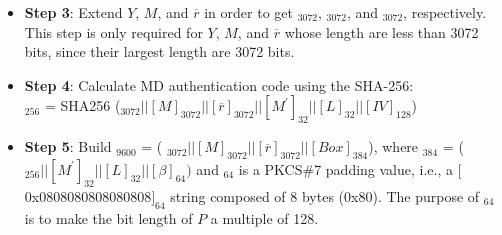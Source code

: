 \documentclass[main\_\_EN.tex]{subfiles}
\begin{document}
\begin{itemize}
    \item {\bfseries Step 3}: Extend \begin{math}Y\end{math}, \begin{math}M\end{math}, and \begin{math}\overline{r}\end{math} in order to get \begin{math}[Y]_{3072}\end{math}, \begin{math}[M]_{3072}\end{math}, and \begin{math}[\overline{r}]_{3072}\end{math}, respectively. This step is only required for \begin{math}Y\end{math}, \begin{math}M\end{math}, and \begin{math}\overline{r}\end{math} whose length are less than 3072 bits, since their largest length are 3072 bits.


    \item {\bfseries Step 4}: Calculate MD authentication code using the SHA-256:\\
                \begin{math}[MD]_{256}\end{math} = SHA256 (\begin{math}
                [Y]_{3072} ||
                [M]_{3072} ||
                [\overline{r}]_{3072} ||
                [M^{\prime}]_{32} ||
                [L]_{32} ||
                [IV]_{128}
            \end{math})

    \item {\bfseries Step 5}: Build \begin{math}[P]_{9600}\end{math} = (
            \begin{math}
                [Y]_{3072} ||
                [M]_{3072} ||
                [\overline{r}]_{3072} ||
                [Box]_{384}
            \end{math}), where
            \begin{math}[Box]_{384}\end{math} = (
            \begin{math}
                [MD]_{256} ||
                [M^{\prime}]_{32} ||
                [L]_{32} ||
                [\beta]_{64})
            \end{math} and
            \begin{math}[\beta]_{64} \end{math} is a PKCS\#7 padding value, i.e., a $[$0x0808080808080808$]_{64}$ string composed of 8 bytes (0x80). The purpose of \begin{math}[\beta]_{64}\end{math} is to make the bit length of \begin{math}P\end{math} a multiple of 128.


\end{itemize}
\end{document}
